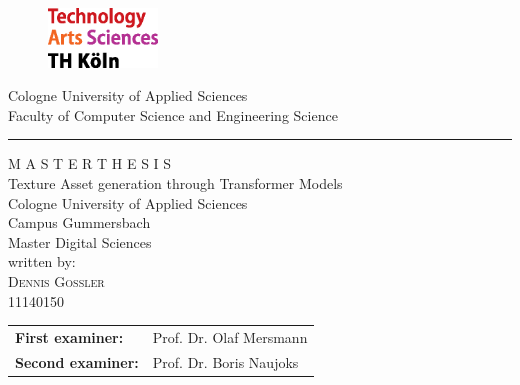 \documentclass[a4paper,12pt,oneside]{article}
\begin{document}
    
    \pagestyle{empty}
    \begin{titlepage}
    \begin{figure}[!ht]
            \includegraphics[width=0.26\textwidth]{sources/logo_TH-Koeln_CMYK_22pt.eps}
    \end{figure}

    \begin{center}
      \Large
      Cologne University of Applied Sciences\\
      Faculty of Computer Science and Engineering Science\\
      \hrule\par\rule{0pt}{2cm} %
      \LARGE
      \textsc{M A S T E R  T H E S I S}\\
      \vspace{1cm} %
      \huge
      Texture Asset generation through Transformer Models\\
      \vspace{1.5cm}
      \large
      Cologne University of Applied Sciences\\
      Campus Gummersbach\\
      Master Digital Sciences\\ 
      \vspace{1.0cm}
      written by:\\
      \textsc{Dennis Goßler}\\
      11140150\\
      \vspace{1.5cm}
      \begin{tabular}{ll} %
          \textbf{First examiner:} & Prof. Dr. Olaf Mersmann \\
          \textbf{Second examiner:} & Prof. Dr. Boris Naujoks \\
      \end{tabular}
    
    \end{center}    
    \end{titlepage}
    
    \newpage
    
\end{document}
